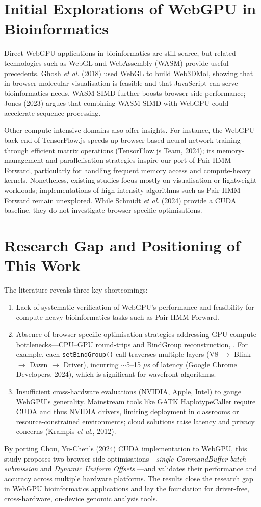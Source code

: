 \documentclass[PhD]{PHlab-thesis}
\begin{document}
\section{Initial Explorations of WebGPU in Bioinformatics}
Direct WebGPU applications in bioinformatics are still scarce, but related technologies such as WebGL and WebAssembly (WASM) provide useful precedents. Ghosh \emph{et al}. (2018) used WebGL to build Web3DMol, showing that in-browser molecular visualisation is feasible and that JavaScript can serve bioinformatics needs. WASM-SIMD further boosts browser-side performance; Jones (2023) argues that combining WASM-SIMD with WebGPU could accelerate sequence processing.

Other compute-intensive domains also offer insights. For instance, the WebGPU back end of TensorFlow.js speeds up browser-based neural-network training through efficient matrix operations (TensorFlow.js Team, 2024); its memory-management and parallelisation strategies inspire our port of Pair-HMM Forward, particularly for handling frequent memory access and compute-heavy kernels. Nonetheless, existing studies focus mostly on visualisation or lightweight workloads; implementations of high-intensity algorithms such as Pair-HMM Forward remain unexplored. While Schmidt \emph{et al}. (2024) provide a CUDA baseline, they do not investigate browser-specific optimisations.

\section{Research Gap and Positioning of This Work}
The literature reveals three key shortcomings:
\begin{enumerate}
    \item Lack of systematic verification of WebGPU's performance and feasibility for compute-heavy bioinformatics tasks such as Pair-HMM Forward.
    \item Absence of browser-specific optimisation strategies addressing GPU-compute bottlenecks—CPU–GPU round-trips and BindGroup reconstruction, . For example, each \texttt{setBindGroup()} call traverses multiple layers (V8 $\rightarrow$ Blink $\rightarrow$ Dawn $\rightarrow$ Driver), incurring $\sim$5–15 $\mu$s of latency (Google Chrome Developers, 2024), which is significant for wavefront algorithms.
    \item Insufficient cross-hardware evaluations (NVIDIA, Apple, Intel) to gauge WebGPU's generality. Mainstream tools like GATK HaplotypeCaller require CUDA and thus NVIDIA drivers, limiting deployment in classrooms or resource-constrained environments; cloud solutions raise latency and privacy concerns (Krampis \emph{et al}., 2012).
\end{enumerate}
By porting Chou, Yu-Chen's (2024) CUDA implementation to WebGPU, this study proposes two browser-side optimisations—\emph{single-CommandBuffer batch submission} and \emph{Dynamic Uniform Offsets} —and validates their performance and accuracy across multiple hardware platforms. The results close the research gap in WebGPU bioinformatics applications and lay the foundation for driver-free, cross-hardware, on-device genomic analysis tools.
\end{document}
